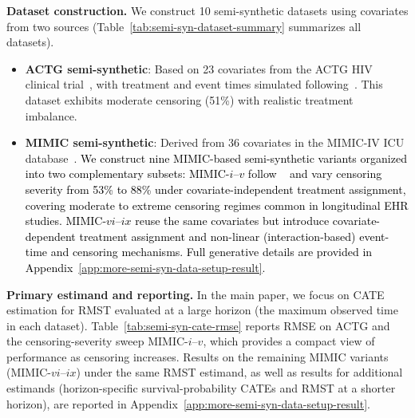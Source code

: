 \documentclass{article} %
\newcommand{\rebuttal}[1]{\textcolor{black}{#1}}
\begin{document}
\textbf{Dataset construction.} We construct 10 semi-synthetic datasets using covariates from two sources (Table~\ref{tab:semi-syn-dataset-summary} summarizes all datasets).
\begin{itemize}[leftmargin=*,topsep=0pt,itemsep=-1pt]
    \item \textbf{ACTG semi-synthetic}: Based on 23 covariates from the ACTG HIV clinical trial~\citep{hammer1996atrial}, with treatment and event times simulated following~\citet{chapfuwa2021enabling}. This dataset exhibits moderate censoring (51\%) with realistic treatment imbalance.
    \item \textbf{MIMIC semi-synthetic}: Derived from 36 covariates in the MIMIC-IV ICU database~\citep{johnson2023mimic}. 
    \rebuttal{We construct nine MIMIC-based semi-synthetic variants organized into two complementary subsets: 
    MIMIC-$i$--$v$ follow ~\citet{meir2025heterogeneous} and vary censoring severity from 53\% to 88\% under covariate-independent treatment assignment, covering moderate to extreme censoring regimes common in longitudinal EHR studies. 
    MIMIC-$vi$--$ix$ reuse the same covariates but introduce covariate-dependent treatment assignment and non-linear (interaction-based) event-time and censoring mechanisms. Full generative details are provided in Appendix~\ref{app:more-semi-syn-data-setup-result}. 
    }
\end{itemize}

\textbf{Primary estimand and reporting.} In the main paper, we focus on CATE estimation for RMST evaluated at a large horizon (the maximum observed time in each dataset). Table~\ref{tab:semi-syn-cate-rmse} reports RMSE on ACTG and the censoring-severity sweep MIMIC-$i$--$v$, which provides a compact view of performance as censoring increases. Results on the remaining MIMIC variants (MIMIC-$vi$--$ix$) under the same RMST estimand, as well as results for additional estimands (horizon-specific survival-probability CATEs and RMST at a shorter horizon), are reported in Appendix~\ref{app:more-semi-syn-data-setup-result}.
\end{document}
